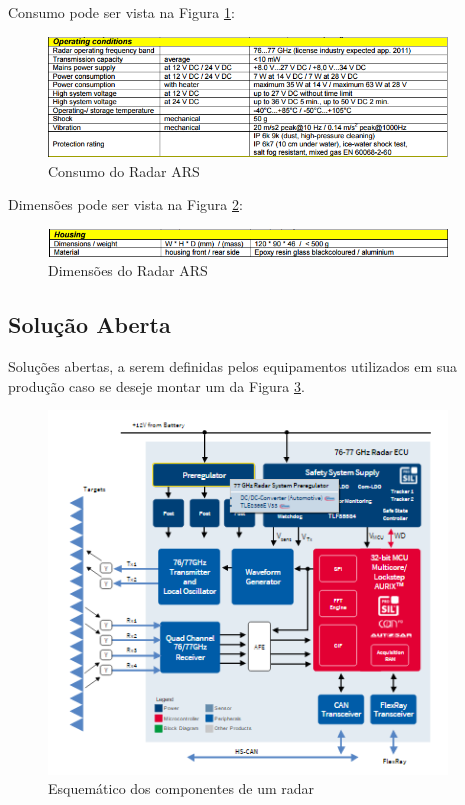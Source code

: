 Consumo pode ser vista na Figura \ref{fig:consumo_radar}:
\begin{figure}[h]
  \centering
  \includegraphics[width=400px, scale=1]{figuras/consumo_radar}
  \caption{Consumo do Radar ARS}
\label{fig:consumo_radar}
\end{figure}

Dimensões pode ser vista na Figura \ref{fig:dimensoes_radar}:
\begin{figure}[h]
  \centering
  \includegraphics[width=400px, scale=1]{figuras/dimensoes_radar}
  \caption{Dimensões do Radar ARS}
\label{fig:dimensoes_radar}
\end{figure}


\subsection{Solução Aberta}
Soluções abertas, a serem definidas pelos equipamentos utilizados em sua produção caso se deseje montar um da
Figura \ref{fig:esquematico_radar}.
\begin{figure}[h]
  \centering
  \includegraphics[width=400px, scale=1]{figuras/esquematico_radar}
  \caption{Esquemático dos componentes de um radar}
\label{fig:esquematico_radar}
\end{figure}

